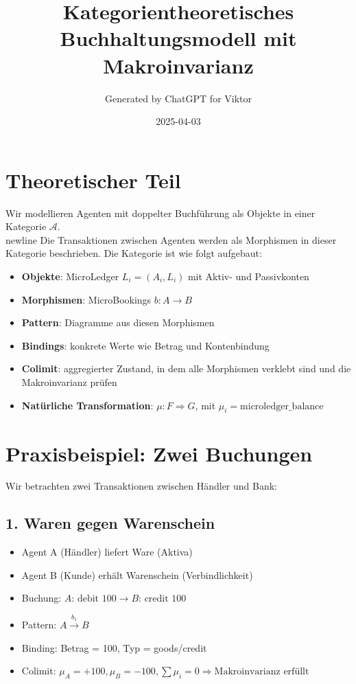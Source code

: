 \documentclass{article}
\title{Kategorientheoretisches Buchhaltungsmodell mit Makroinvarianz}
\author{Generated by ChatGPT for Viktor}
\date{2025-04-03}
\begin{document}
\maketitle

\section*{Theoretischer Teil}

Wir modellieren Agenten mit doppelter Buchführung als Objekte in einer Kategorie \( \mathcal{A} \).\\newline
Die Transaktionen zwischen Agenten werden als Morphismen in dieser Kategorie beschrieben. Die Kategorie ist wie folgt aufgebaut:

\begin{itemize}
  \item \textbf{Objekte}: MicroLedger \( L_i = (A_i, L_i) \) mit Aktiv- und Passivkonten
  \item \textbf{Morphismen}: MicroBookings \( b: A \to B \)
  \item \textbf{Pattern}: Diagramme aus diesen Morphismen
  \item \textbf{Bindings}: konkrete Werte wie Betrag und Kontenbindung
  \item \textbf{Colimit}: aggregierter Zustand, in dem alle Morphismen verklebt sind und die Makroinvarianz prüfen
  \item \textbf{Natürliche Transformation}: \( \mu: F \Rightarrow G \), mit \( \mu_i = \text{microledger\_balance} \)
\end{itemize}

\section*{Praxisbeispiel: Zwei Buchungen}

Wir betrachten zwei Transaktionen zwischen Händler und Bank:

\subsection*{1. Waren gegen Warenschein}

\begin{itemize}
  \item Agent A (Händler) liefert Ware (Aktiva)
  \item Agent B (Kunde) erhält Warenschein (Verbindlichkeit)
  \item Buchung: \( A: \, \text{debit 100} \rightarrow B: \, \text{credit 100} \)
  \item Pattern: \( A \xrightarrow{b_1} B \)
  \item Binding: Betrag = 100, Typ = goods/credit
  \item Colimit: \( \mu_A = +100, \mu_B = -100, \sum \mu_i = 0 \Rightarrow \text{Makroinvarianz erfüllt} \)
\end{itemize}
\end{document}
